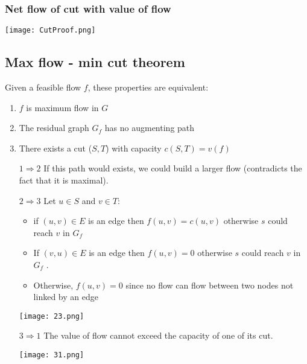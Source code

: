\subsubsection{Net flow of cut with value of flow}
\begin{center}
    \texttt{[image: CutProof.png]}
\end{center}

\subsection{Max flow - min cut theorem}
Given a feasible flow $f$, these properties are equivalent:
\begin{enumerate}
    \item $f$ is maximum flow in $G$
    \item The residual graph $G_f$ has no augmenting path
    \item There exists a cut ($S, T$) with capacity $c(S, T) = v(f)$
\end{enumerate}

\begin{itemize}
    \item[$1\Rightarrow2$] If this path would exists, we could build a
        larger flow (contradicts the fact that it is maximal).

    \item[$2\Rightarrow3$] Let $u \in S$ and $v\in T$:
        \begin{itemize}
            \item if $(u, v) \in E$ is an edge then $f(u, v) = c(u, v)$
                otherwise $s$ could reach $v$ in $G_f$ 
            \item If $(v, u) \in E$ is an edge then $f(u, v) = 0$
                otherwise $s$ could reach $v$ in $G_f$ .
            \item Otherwise, $f(u, v) = 0$ since no flow can flow between
                two nodes not linked by an edge
        \end{itemize}
        \begin{center}
    \texttt{[image: 23.png]}
    \end{center}

    \item[$3\Rightarrow1$] The value of flow cannot exceed the capacity of one of its
        cut.
        \begin{center}
    \texttt{[image: 31.png]}
    \end{center}
    \end{itemize}

